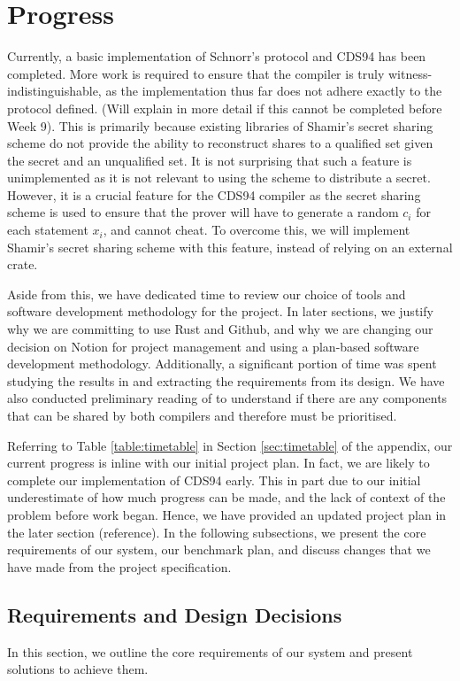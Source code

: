 \section{Progress}
\label{sec:progress}
Currently, a basic implementation of Schnorr's protocol and CDS94 has been completed. More work is required to ensure that the compiler is truly witness-indistinguishable, as the implementation thus far does not adhere exactly to the protocol defined. (Will explain in more detail if this cannot be completed before Week 9). This is primarily because existing libraries of Shamir's secret sharing scheme do not provide the ability to reconstruct shares to a qualified set given the secret and an unqualified set. It is not surprising that such a feature is unimplemented as it is not relevant to using the scheme to distribute a secret. However, it is a crucial feature for the CDS94 compiler as the secret sharing scheme is used to ensure that the prover will have to generate a random $c_i$ for each statement $x_i$, and cannot cheat. To overcome this, we will implement Shamir's secret sharing scheme with this feature, instead of relying on an external crate. 

Aside from this, we have dedicated time to review our choice of tools and software development methodology for the project. In later sections, we justify why we are committing to use Rust and Github, and why we are changing our decision on Notion for project management and using a plan-based software development methodology. Additionally, a significant portion of time was spent studying the results in \cite{CDS94} and extracting the requirements from its design. We have also conducted preliminary reading of \cite{StackingSigmas} to understand if there are any components that can be shared by both compilers and therefore must be prioritised. 

Referring to Table \ref{table:timetable} in Section \ref{sec:timetable} of the appendix, our current progress is inline with our initial project plan. In fact, we are likely to complete our implementation of CDS94 early. This in part due to our initial underestimate of how much progress can be made, and the lack of context of the problem before work began. Hence, we have provided an updated project plan in the later section (reference). In the following subsections, we present the core requirements of our system, our benchmark plan, and discuss changes that we have made from the project specification. 

\subsection{Requirements and Design Decisions}
In this section, we outline the core requirements of our system and present solutions to achieve them.

